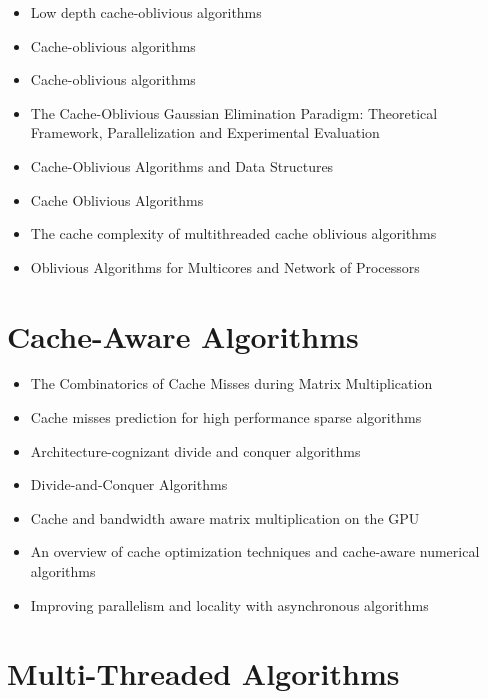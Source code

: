 \begin{itemize}
\item[\textbullet] Low depth cache-oblivious algorithms
  \cite{Blelloch2009}
\item[\textbullet] Cache-oblivious algorithms \cite{Frigo1999}
\item[\textbullet] Cache-oblivious algorithms \cite{Prokop1999}
\item[\textbullet] The Cache-Oblivious Gaussian Elimination Paradigm:
  Theoretical Framework, Parallelization and Experimental Evaluation
  \cite{Chowdhury2007}
\item[\textbullet] Cache-Oblivious Algorithms and Data Structures
  \cite{Demaine2002}
\item[\textbullet] Cache Oblivious Algorithms \cite{Kumar2003}
\item[\textbullet] The cache complexity of multithreaded cache
  oblivious algorithms \cite{Frigo2009}
\item[\textbullet] Oblivious Algorithms for Multicores and Network of
  Processors \cite{Chowdhury2009}
\end{itemize}


\section*{Cache-Aware Algorithms}
\label{sec:lr-cache-aware-algorithms}

\begin{itemize}
\item[\textbullet] The Combinatorics of Cache Misses during Matrix
  Multiplication \cite{Chatterjee2000}
\item[\textbullet] Cache misses prediction for high performance sparse
  algorithms \cite{Fraguela1998}
\item[\textbullet] Architecture-cognizant divide and conquer
  algorithms \cite{Gatlin1999}
\item[\textbullet] Divide-and-Conquer Algorithms \cite{Gurari2010}
\item[\textbullet] Cache and bandwidth aware matrix multiplication on
  the GPU \cite{Hall2001}
\item[\textbullet] An overview of cache optimization techniques and
  cache-aware numerical algorithms \cite{Kowarschik2003}
\item[\textbullet] Improving parallelism and locality with
  asynchronous algorithms \cite{Liu2010}
\end{itemize}


\section*{Multi-Threaded Algorithms}
\label{sec:lr-multi-threaded-algorithms}

